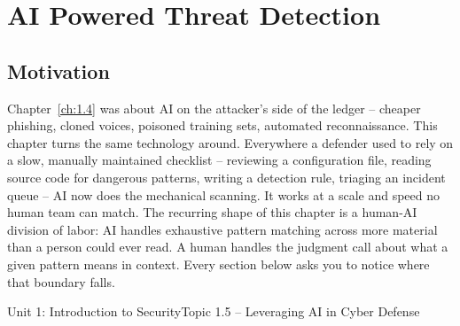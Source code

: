 \chapter{AI Powered Threat Detection}
\label{ch:1.5}


\section{Motivation}

Chapter~\ref{ch:1.4} was about AI on the attacker's side of the ledger -- cheaper phishing,
cloned voices, poisoned training sets, automated reconnaissance. This chapter turns the same
technology around. Everywhere a defender used to rely on a slow, manually maintained checklist --
reviewing a configuration file, reading source code for dangerous patterns, writing a detection
rule, triaging an incident queue -- AI now does the mechanical scanning. It works at a scale and
speed no human team can match. The recurring shape of this chapter is a human-AI division of
labor: AI handles exhaustive pattern matching across more material than a person could ever read.
A human handles the judgment call about what a given pattern means in context. Every section below
asks you to notice where that boundary falls.

\begin{apalignment}{Unit 1: Introduction to Security}{Topic 1.5 -- Leveraging AI in Cyber Defense}
\begin{apobjectives}
\end{apobjectives}
\end{apalignment}

